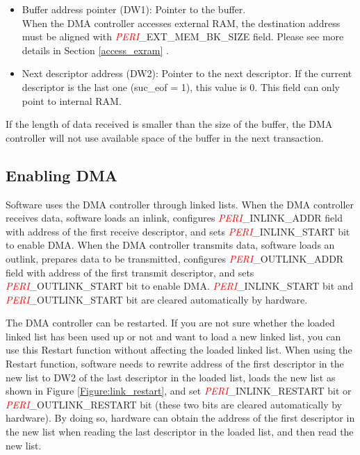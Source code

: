 \documentclass[main\_\_EN.tex]{subfiles}
\begin{document}
\begin{itemize}
    \item Buffer address pointer (DW1): Pointer to the buffer.\\
    When the DMA controller accesses external RAM, the destination address must be aligned with \textcolor{red}{\it{PERI}}\_EXT\_MEM\_BK\_SIZE field. Please see more details in Section \ref{access_exram} \textit{}.
    \item Next descriptor address (DW2): Pointer to the next descriptor. If the current descriptor is the last one (suc\_eof = 1), this value is 0. This field can only point to internal RAM.\\
\end{itemize}

If the length of data received is smaller than the size of the buffer, the DMA controller will not use available space of the buffer in the next transaction.

\subsection{Enabling DMA}

Software uses the DMA controller through linked lists. When the DMA controller receives data, software loads an inlink, configures \textcolor{red}{\it{PERI}}\_INLINK\_ADDR field with address of the first receive descriptor, and sets \textcolor{red}{\it{PERI}}\_INLINK\_START bit to enable DMA. When the DMA controller transmits data, software loads an outlink, prepares data to be transmitted, configures \textcolor{red}{\it{PERI}}\_OUTLINK\_ADDR field with address of the first transmit descriptor, and sets \textcolor{red}{\it{PERI}}\_OUTLINK\_START bit to enable DMA. \textcolor{red}{\it{PERI}}\_INLINK\_START bit and \textcolor{red}{\it{PERI}}\_OUTLINK\_START bit are cleared automatically by hardware.

The DMA controller can be restarted.
If you are not sure whether the loaded linked list has been used up or not and want to load a new linked list, you can use this Restart function without affecting the loaded linked list.
When using the Restart function, software needs to rewrite address of the first descriptor in the new list to DW2 of the last descriptor in the loaded list, loads the new list as shown in Figure \ref{Figure:link_restart}, and set \textcolor{red}{\it{PERI}}\_INLINK\_RESTART bit or \textcolor{red}{\it{PERI}}\_OUTLINK\_RESTART bit (these two bits are cleared automatically by hardware). By doing so, hardware can obtain the address of the first descriptor in the new list when reading the last descriptor in the loaded list, and then read the new list.
\end{document}
